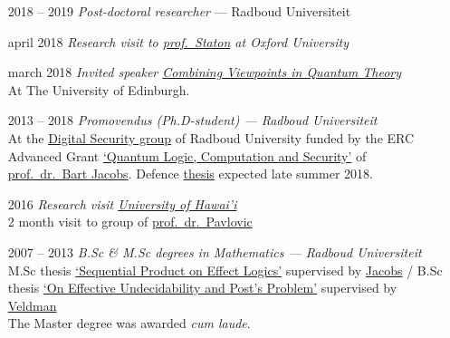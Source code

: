 \documentclass{article}
\newcommand\hsep{ {\color{gray}/} }
\newcommand\partitle[1]{\vskip20pt\par\noindent{\textsf{\textbf{#1}}}}
\begin{document}
\partitle{Academic career}
\begin{itemize}
    \item[2018 -- 2019] \emph{Post-doctoral researcher} --- Radboud Universiteit
    \item[april 2018] \emph{Research visit to \href{http://www.cs.ox.ac.uk/people/samuel.staton/main.html}{prof.~Staton} at Oxford University}
    \item[march 2018] \emph{Invited speaker \href{http://homepages.inf.ed.ac.uk/cheunen/cvqt/}{Combining Viewpoints in Quantum Theory}}\\
        At The University of Edinburgh.
    \item[2013 -- 2018]  \emph{Promovendus (Ph.D-student) ---
        Radboud Universiteit}\\
        At the \href{http://www.ru.nl/ds/}{Digital Security group}
        of Radboud University funded by
        the ERC Advanced Grant \href{https://cordis.europa.eu/project/rcn/107285_en.html}{`Quantum Logic, Computation and Security'}
        of \href{http://www.cs.ru.nl/B.Jacobs/}{prof.~dr.~Bart Jacobs}.
            Defence
            \href{http://westerbaan.name/~bas/thesis.pdf}{thesis}
            expected late summer 2018.
    \item[2016] \emph{Research visit \href{http://manoa.hawaii.edu}{University of Hawai'i}}\\
        2 month visit to group of \href{http://dusko.org}{prof.~dr.~Pavlovic}
    \item[2007 -- 2013] \emph{B.Sc \& M.Sc degrees in Mathematics ---
                Radboud Universiteit} \\
        M.Sc thesis \href{www.ru.nl/publish/pages/813276/masterscriptie_bas_westerbaan.pdf}{`Sequential Product on Effect Logics'}
            supervised by \href{http://www.cs.ru.nl/B.Jacobs/}{Jacobs} \hsep
        B.Sc thesis \href{https://arxiv.org/abs/1409.1030}{`On Effective Undecidability and Post's Problem'}
            supervised by \href{http://www.ru.nl/wiskunde/@1039532/veldman-dhr-dr-(wim)/}{Veldman}\\
        The Master degree was awarded \emph{cum laude}.
\end{itemize}
\end{document}
